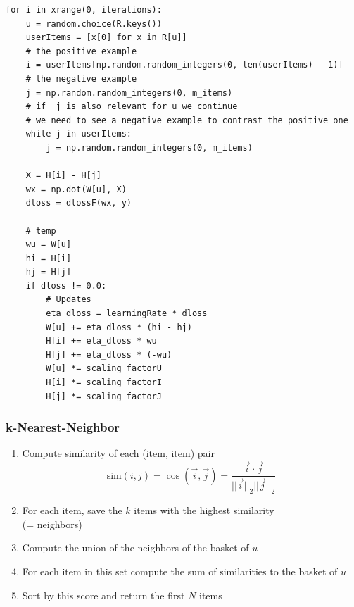 \documentclass[mathserif,svgnames]{beamer}
\begin{document}
\begin{frame}[fragile]
\beamertemplatenavigationsymbolsempty
\begin{lstlisting}[style=python]
for i in xrange(0, iterations):
    u = random.choice(R.keys())
    userItems = [x[0] for x in R[u]]
    # the positive example
    i = userItems[np.random.random_integers(0, len(userItems) - 1)]
    # the negative example
    j = np.random.random_integers(0, m_items)
    # if  j is also relevant for u we continue
    # we need to see a negative example to contrast the positive one
    while j in userItems:
        j = np.random.random_integers(0, m_items)

    X = H[i] - H[j]
    wx = np.dot(W[u], X)
    dloss = dlossF(wx, y)

    # temp
    wu = W[u]
    hi = H[i]
    hj = H[j]
    if dloss != 0.0:
        # Updates
        eta_dloss = learningRate * dloss
        W[u] += eta_dloss * (hi - hj)
        H[i] += eta_dloss * wu
        H[j] += eta_dloss * (-wu)
        W[u] *= scaling_factorU
        H[i] *= scaling_factorI
        H[j] *= scaling_factorJ
\end{lstlisting}
\end{frame}
\begin{frame}
    \frametitle{k-Nearest-Neighbor~\cite{Karypis:2001:EIT:502585.502627}}
    \begin{enumerate}
        \item <2->Compute similarity of each (item, item) pair
            \begin{equation}
                \text{sim}(i,j) = \cos(\vec{i}, \vec{j})=\frac{\vec{i} \cdot \vec{j}}{||\vec{i}||_{2} ||\vec{j}||_{2}}
            \end{equation}
    \item <3->For each item, save the $k$ items with the highest similarity\\(= neighbors)
    \item <4->Compute the union of the neighbors of the basket of $u$
    \item <5->For each item in this set compute the sum of similarities to the basket of $u$
    \item <6->Sort by this score and return the first $N$ items
\end{enumerate}
\end{frame}
\end{document}
